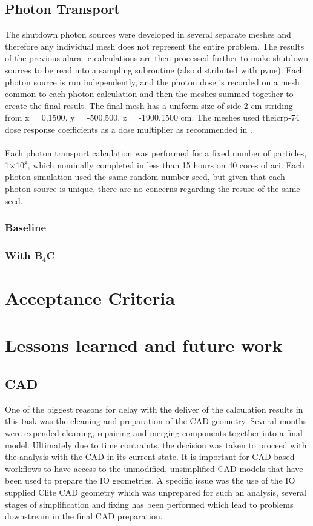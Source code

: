 \documentclass[12pt]{article}
\begin{document}
\subsection{Photon Transport}
The shutdown photon sources were developed in several separate meshes and
therefore any individual mesh does not represent the entire problem. The
results of the previous \gls{alara_c} calculations are then processed further
to make shutdown sources to be read into a sampling subroutine (also distributed
with \gls{pyne}). Each photon source is run independently, and the photon dose
is recorded on a mesh common to each photon calculation and then the meshes
summed together to create the final result. The final mesh has a uniform size of
side 2 cm striding from x = {0,1500}, y = {-500,500}, z = {-1900,1500} cm.
The meshes used the\gls{icrp}-74 dose response coefficients as a dose multiplier
as recommended in \cite{iter_sdr_coeffs}.
\\
\\
Each photon transport calculation was performed for a fixed number of particles,
1$\times$10$^8$, which nominally completed in less than 15 hours on 40 cores of
\gls{aci}. Each photon simulation used the same random number seed, but given
that each photon source is unique, there are no concerns regarding the resuse
of the same seed.
\subsubsection{Baseline}
\subsubsection{With B$_4$C}
\newpage
\clearpage
\section{Acceptance Criteria}
\newpage
\clearpage
\section{Lessons learned and future work}
\subsection*{CAD}
One of the biggest reasons for delay with the deliver of the calculation results
in this task was the cleaning and preparation of the CAD geometry. Several
months were expended cleaning, repairing and merging components together into a
final model. Ultimately due to time contraints, the decision was taken to
proceed with the analysis with the CAD in its current state. It is important
for CAD based workflows to have access to the unmodified, unsimplified CAD
models that have been used to prepare the IO geometries. A specific issue
was the use of the IO supplied Clite CAD geometry which was unprepared for
such an analysis, several stages of simplification and fixing has been performed
which lead to problems downstream in the final CAD preparation.
\end{document}
